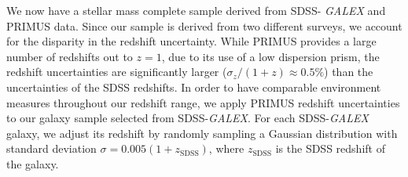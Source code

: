 \documentclass{emulateapj}
\begin{document}
We now have a stellar mass complete sample derived from SDSS-{\em
  GALEX} and PRIMUS data. Since our sample is derived from two
different surveys, we account for the disparity in the redshift
uncertainty. While PRIMUS provides a large number of redshifts out to
$z = 1$, due to its use of a low dispersion prism, the redshift
uncertainties are significantly larger ($\sigma_{z}/(1+z) \approx 0.5
\%$) than the uncertainties of the SDSS redshifts. In order to have
comparable environment measures throughout our redshift range, we
apply PRIMUS redshift uncertainties to our galaxy sample selected from
SDSS-{\em GALEX}. For each SDSS-{\em GALEX} galaxy, we adjust its
redshift by randomly sampling a Gaussian distribution with standard
deviation $\sigma = 0.005 (1+z_\mathrm{SDSS})$, where
$z_\mathrm{SDSS}$ is the SDSS redshift of the galaxy.

\end{document}
